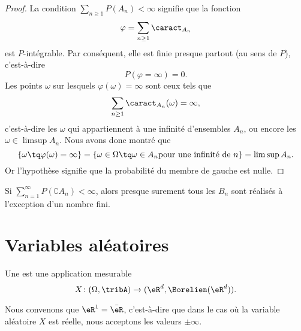 \begin{proof}
    La condition \( \sum_{n\geq 1}P(A_n)<\infty\) signifie que la fonction
    \begin{equation}
        \varphi=\sum_{n\geq 1}\caract_{A_n}
    \end{equation}
    est \( P\)-intégrable. Par conséquent, elle est finie presque partout (au sens de \( P\)), c'est-à-dire
    \begin{equation}
        P(\varphi=\infty)=0.
    \end{equation}
    Les points \( \omega\) sur lesquels \( \varphi(\omega)=\infty\) sont ceux tels que
    \begin{equation}
        \sum_{n\geq 1}\caract_{A_n}(\omega)=\infty,
    \end{equation}
    c'est-à-dire les \( \omega\) qui appartiennent à une infinité d'ensembles \( A_n\), ou encore les \( \omega\in\limsup A_n\). Nous avons donc montré que
    \begin{equation}
        \{ \omega\tq \varphi(\omega)=\infty \}=\{ \omega\in\Omega\tq \omega\in A_n\text{pour une infinité de } n \}=\limsup A_n.
    \end{equation}
    Or l'hypothèse signifie que la probabilité du membre de gauche est nulle.
\end{proof}

\begin{corollary}
    Si \( \sum_{n=1}^{\infty}P(\complement A_n)<\infty\), alors presque surement tous les \( B_n\) sont réalisés à l'exception d'un nombre fini.
\end{corollary}

\section{Variables aléatoires}

\begin{definition}
    Une  est une application mesurable
    \begin{equation}
        X\colon (\Omega,\tribA)\to (\eR^d,\Borelien(\eR^d)).
    \end{equation}
\end{definition}
Nous convenons que \( \eR^1=\bar\eR\), c'est-à-dire que dans le cas où la variable aléatoire \( X\) est réelle, nous acceptons les valeurs \( \pm\infty\).

